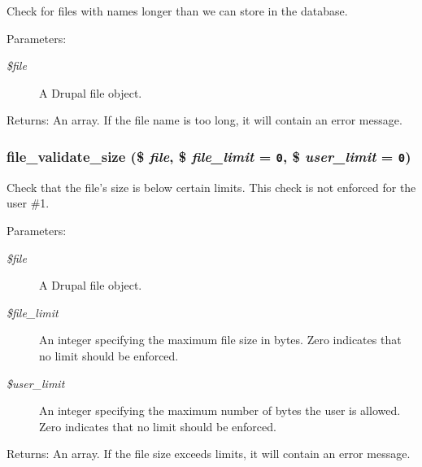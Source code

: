 Check for files with names longer than we can store in the database.

\begin{Desc}
\item[Parameters:]
\begin{description}
\item[{\em \$file}]A Drupal file object. \end{description}
\end{Desc}
\begin{Desc}
\item[Returns:]An array. If the file name is too long, it will contain an error message. \end{Desc}
\hypertarget{group__file_g69120c7a4e953069673539c6710575f4}{
\subsubsection[{file\_\-validate\_\-size}]{\setlength{\rightskip}{0pt plus 5cm}file\_\-validate\_\-size (\$ {\em file}, \/  \$ {\em file\_\-limit} = {\tt 0}, \/  \$ {\em user\_\-limit} = {\tt 0})}}
\label{group__file_g69120c7a4e953069673539c6710575f4}


Check that the file's size is below certain limits. This check is not enforced for the user \#1.

\begin{Desc}
\item[Parameters:]
\begin{description}
\item[{\em \$file}]A Drupal file object. \item[{\em \$file\_\-limit}]An integer specifying the maximum file size in bytes. Zero indicates that no limit should be enforced. \item[{\em \$user\_\-limit}]An integer specifying the maximum number of bytes the user is allowed. Zero indicates that no limit should be enforced. \end{description}
\end{Desc}
\begin{Desc}
\item[Returns:]An array. If the file size exceeds limits, it will contain an error message. \end{Desc}
